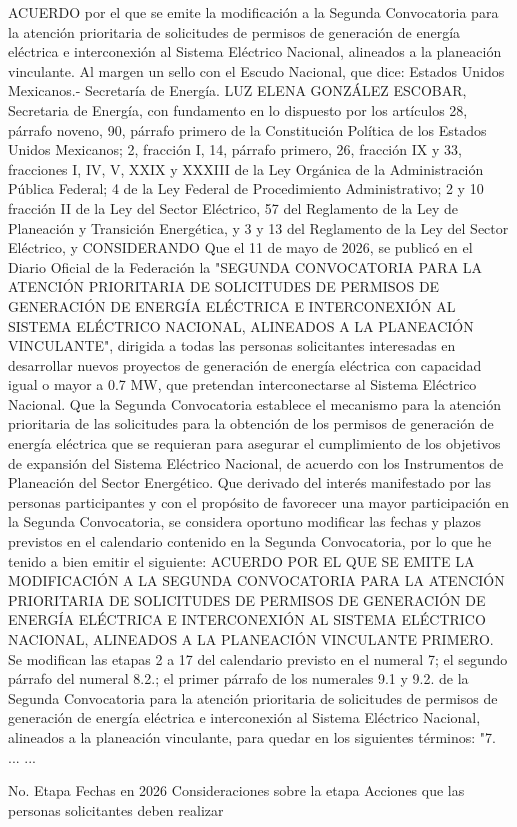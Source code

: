 \begingroup
\senertexto
ACUERDO por el que se emite la modificación a la Segunda Convocatoria para la atención prioritaria de solicitudes de permisos de generación de energía eléctrica e interconexión al Sistema Eléctrico Nacional, alineados a la planeación vinculante.
Al margen un sello con el Escudo Nacional, que dice: Estados Unidos Mexicanos.- Secretaría de Energía.
LUZ ELENA GONZÁLEZ ESCOBAR, Secretaria de Energía, con fundamento en lo dispuesto por los artículos 28, párrafo noveno, 90, párrafo primero de la Constitución Política de los Estados Unidos Mexicanos; 2, fracción I, 14, párrafo primero, 26, fracción IX y 33, fracciones I, IV, V, XXIX y XXXIII de la Ley Orgánica de la Administración Pública Federal; 4 de la Ley Federal de Procedimiento Administrativo; 2 y 10 fracción II de la Ley del Sector Eléctrico, 57 del Reglamento de la Ley de Planeación y Transición Energética, y 3 y 13 del Reglamento de la Ley del Sector Eléctrico, y
CONSIDERANDO
Que el 11 de mayo de 2026, se publicó en el Diario Oficial de la Federación la "SEGUNDA CONVOCATORIA PARA LA ATENCIÓN PRIORITARIA DE SOLICITUDES DE PERMISOS DE GENERACIÓN DE ENERGÍA ELÉCTRICA E INTERCONEXIÓN AL SISTEMA ELÉCTRICO NACIONAL, ALINEADOS A LA PLANEACIÓN VINCULANTE", dirigida a todas las personas solicitantes interesadas en desarrollar nuevos proyectos de generación de energía eléctrica con capacidad igual o mayor a 0.7 MW, que pretendan interconectarse al Sistema Eléctrico Nacional.
Que la Segunda Convocatoria establece el mecanismo para la atención prioritaria de las solicitudes para la obtención de los permisos de generación de energía eléctrica que se requieran para asegurar el cumplimiento de los objetivos de expansión del Sistema Eléctrico Nacional, de acuerdo con los Instrumentos de Planeación del Sector Energético.
Que derivado del interés manifestado por las personas participantes y con el propósito de favorecer una mayor participación en la Segunda Convocatoria, se considera oportuno modificar las fechas y plazos previstos en el calendario contenido en la Segunda Convocatoria, por lo que he tenido a bien emitir el siguiente:
ACUERDO POR EL QUE SE EMITE LA MODIFICACIÓN A LA SEGUNDA CONVOCATORIA PARA LA ATENCIÓN PRIORITARIA DE SOLICITUDES DE PERMISOS DE GENERACIÓN DE ENERGÍA ELÉCTRICA E INTERCONEXIÓN AL SISTEMA ELÉCTRICO NACIONAL, ALINEADOS A LA PLANEACIÓN VINCULANTE
PRIMERO. Se modifican las etapas 2 a 17 del calendario previsto en el numeral 7; el segundo párrafo del numeral 8.2.; el primer párrafo de los numerales 9.1 y 9.2. de la Segunda Convocatoria para la atención prioritaria de solicitudes de permisos de generación de energía eléctrica e interconexión al Sistema Eléctrico Nacional, alineados a la planeación vinculante, para quedar en los siguientes términos:
"7. ...
...\par
No.
 Etapa
 Fechas en 2026
 Consideraciones sobre la etapa
 Acciones que las personas solicitantes deben realizar
 
